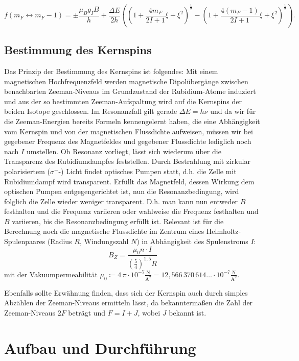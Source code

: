 \documentclass[bigchapter,colorback,accentcolor=tud4b,linedtoc,11pt]{tudreport}
\begin{document}
$$f(m_F \leftrightarrow m_F-1) = \pm \frac{\mu_B g_I B}{h} + \frac{\Delta E}{2h} \left( ( 1 + \frac{4 m_F}{2I+1} \xi + \xi^2 )^{\frac{1}{2}} - ( 1 + \frac{4 (m_F - 1)}{2I+1} \xi + \xi^2 )^{\frac{1}{2}} \right).$$

\section{Bestimmung des Kernspins}

Das Prinzip der Bestimmung des Kernspins ist folgendes: Mit einem magnetischen Hochfrequenzfeld werden magnetische Dipolübergänge zwischen benachbarten Zeeman-Niveaus im Grundzustand der Rubidium-Atome induziert und aus der so bestimmten Zeeman-Aufspaltung wird auf die Kernspins der beiden Isotope geschlossen. Im Resonanzfall gilt gerade $\Delta E = h \nu$ und da wir für die Zeeman-Energien bereits Formeln kennengelernt haben, die eine Abhängigkeit vom Kernspin und von der magnetischen Flussdichte aufweisen, müssen wir bei gegebener Frequenz des Magnetfeldes und gegebener Flussdichte lediglich noch nach $I$ umstellen. Ob Resonanz vorliegt, lässt sich wiederum über die Transparenz des Rubidiumdampfes feststellen. Durch Bestrahlung mit zirkular polarisiertem ($\sigma^-$-) Licht findet optisches Pumpen statt, d.h. die Zelle mit Rubidiumdampf wird transparent. Erfüllt das Magnetfeld, dessen Wirkung dem optischen Pumpen entgegengerichtet ist, nun die Resonanzbedingung, wird folglich die Zelle wieder weniger transparent. D.h. man kann nun entweder $B$ festhalten und die Frequenz variieren oder wahlweise die Frequenz festhalten und $B$ variieren, bis die Resonanzbedingung erfüllt ist. Relevant ist für die Berechnung noch die magnetische Flussdichte im Zentrum eines Helmholtz-Spulenpaares (Radius $R$, Windungszahl $N$) in Abhängigkeit des Spulenstroms $I$:
$$B_Z = \frac{\mu_0 n \cdot I}{{\left( \frac{5}{4}\right)}^{1,5} R}$$
mit der Vakuumpermeabilität $\mu_0 \coloneqq 4\,\pi \cdot 10^{-7} \frac{\mathrm{N}}{\mathrm{A}^2} = 12{,}566\,370\,614\ldots \cdot 10^{-7} \frac{\mathrm{N}}{\mathrm{A}^2}$.

Ebenfalls sollte Erwähnung finden, dass sich der Kernspin auch durch simples Abzählen der Zeeman-Niveaus ermitteln lässt, da bekanntermaßen die Zahl der Zeeman-Niveaus $2F$ beträgt und $F= I+J$, wobei $J$ bekannt ist.

\chapter{Aufbau und Durchführung}
\end{document}

